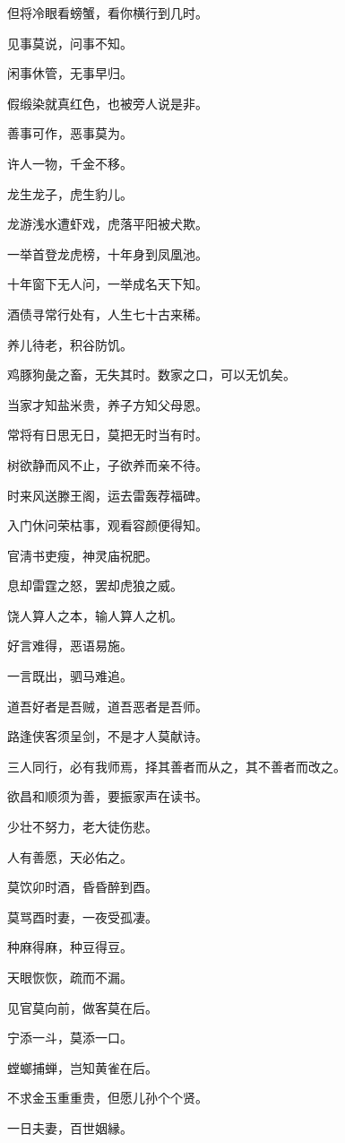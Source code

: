 \documentclass[12pt,oneside]{book}
\begin{document}
但将冷眼看螃蟹，看你横行到几时。

见事莫说，问事不知。

闲事休管，无事早归。

假缎染就真红色，也被旁人说是非。

善事可作，恶事莫为。

许人一物，千金不移。

龙生龙子，虎生豹儿。

龙游浅水遭虾戏，虎落平阳被犬欺。

一举首登龙虎榜，十年身到凤凰池。

十年窗下无人问，一举成名天下知。

酒债寻常行处有，人生七十古来稀。

养儿待老，积谷防饥。

鸡豚狗彘之畜，无失其时。数家之口，可以无饥矣。

当家才知盐米贵，养子方知父母恩。

常将有日思无日，莫把无时当有时。

树欲静而风不止，子欲养而亲不待。

时来风送滕王阁，运去雷轰荐福碑。

入门休问荣枯事，观看容颜便得知。

官淸书吏瘦，神灵庙祝肥。

息却雷霆之怒，罢却虎狼之威。

饶人算人之本，输人算人之机。

好言难得，恶语易施。

一言既出，驷马难追。

道吾好者是吾贼，道吾恶者是吾师。

路逢侠客须呈剑，不是才人莫献诗。

三人同行，必有我师焉，择其善者而从之，其不善者而改之。

欲昌和顺须为善，要振家声在读书。

少壮不努力，老大徒伤悲。

人有善愿，天必佑之。

莫饮卯时酒，昏昏醉到酉。

莫骂酉时妻，一夜受孤凄。

种麻得麻，种豆得豆。

天眼恢恢，疏而不漏。

见官莫向前，做客莫在后。

宁添一斗，莫添一口。

螳螂捕蝉，岂知黄雀在后。

不求金玉重重贵，但愿儿孙个个贤。

一日夫妻，百世姻縁。
\end{document}
